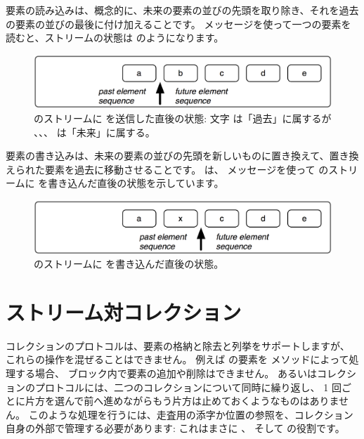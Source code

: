 \documentclass[a4paper,10pt,twoside]{book}
\begin{document}
要素の読み込みは、概念的に、未来の要素の並びの先頭を取り除き、それを過去の要素の並びの最後に付け加えることです。
 メッセージを使って一つの要素を読むと、ストリームの状態は のようになります。

\begin{figure}[ht]
\centerline{\includegraphics[scale=0.5]{a_bcdeStef}}
\caption{ のストリームに  を送信した直後の状態: 文字  は「過去」に属するが 、、、 は「未来」に属する。}
\vspace{.2in}
\end{figure}

要素の書き込みは、未来の要素の並びの先頭を新しいものに置き換えて、置き換えられた要素を過去に移動させることです。
 は、  メッセージを使って のストリームに  を書き込んだ直後の状態を示しています。

\begin{figure}[ht]
\centerline{\includegraphics[scale=0.5]{ax_cdeStef}}
\caption{ のストリームに  を書き込んだ直後の状態。}
\vspace{.2in}
\end{figure}

\section{ストリーム対コレクション}

コレクションのプロトコルは、要素の格納と除去と列挙をサポートしますが、
これらの操作を混ぜることはできません。
例えば  の要素を  メソッドによって処理する場合、
 ブロック内で要素の追加や削除はできません。
あるいはコレクションのプロトコルには、二つのコレクションについて同時に繰り返し、
1  回ごとに片方を選んで前へ進めながらもう片方は止めておくようなものはありません。
このような処理を行うには、走査用の添字か位置の参照を、コレクション自身の外部で管理する必要があります:
これはまさに 、 そして  の役割です。
\end{document}
